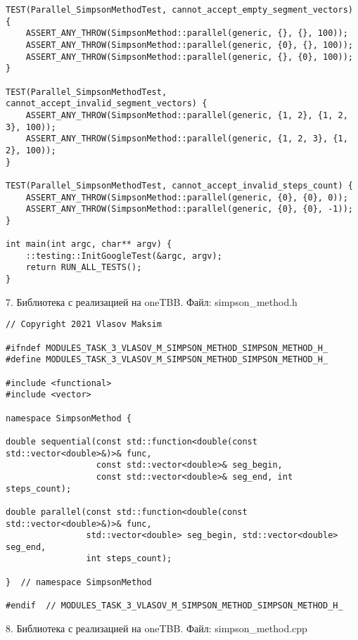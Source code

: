 \documentclass{report}
\begin{document}
\begin{lstlisting}
TEST(Parallel_SimpsonMethodTest, cannot_accept_empty_segment_vectors) {
    ASSERT_ANY_THROW(SimpsonMethod::parallel(generic, {}, {}, 100));
    ASSERT_ANY_THROW(SimpsonMethod::parallel(generic, {0}, {}, 100));
    ASSERT_ANY_THROW(SimpsonMethod::parallel(generic, {}, {0}, 100));
}

TEST(Parallel_SimpsonMethodTest, cannot_accept_invalid_segment_vectors) {
    ASSERT_ANY_THROW(SimpsonMethod::parallel(generic, {1, 2}, {1, 2, 3}, 100));
    ASSERT_ANY_THROW(SimpsonMethod::parallel(generic, {1, 2, 3}, {1, 2}, 100));
}

TEST(Parallel_SimpsonMethodTest, cannot_accept_invalid_steps_count) {
    ASSERT_ANY_THROW(SimpsonMethod::parallel(generic, {0}, {0}, 0));
    ASSERT_ANY_THROW(SimpsonMethod::parallel(generic, {0}, {0}, -1));
}

int main(int argc, char** argv) {
    ::testing::InitGoogleTest(&argc, argv);
    return RUN_ALL_TESTS();
}
\end{lstlisting}

\par 7. Библиотека с реализацией на oneTBB. Файл: simpson\_method.h

\begin{lstlisting}
// Copyright 2021 Vlasov Maksim

#ifndef MODULES_TASK_3_VLASOV_M_SIMPSON_METHOD_SIMPSON_METHOD_H_
#define MODULES_TASK_3_VLASOV_M_SIMPSON_METHOD_SIMPSON_METHOD_H_

#include <functional>
#include <vector>

namespace SimpsonMethod {

double sequential(const std::function<double(const std::vector<double>&)>& func,
                  const std::vector<double>& seg_begin,
                  const std::vector<double>& seg_end, int steps_count);

double parallel(const std::function<double(const std::vector<double>&)>& func,
                std::vector<double> seg_begin, std::vector<double> seg_end,
                int steps_count);

}  // namespace SimpsonMethod

#endif  // MODULES_TASK_3_VLASOV_M_SIMPSON_METHOD_SIMPSON_METHOD_H_
\end{lstlisting}

\par 8. Библиотека с реализацией на oneTBB. Файл: simpson\_method.cpp
\end{document}
